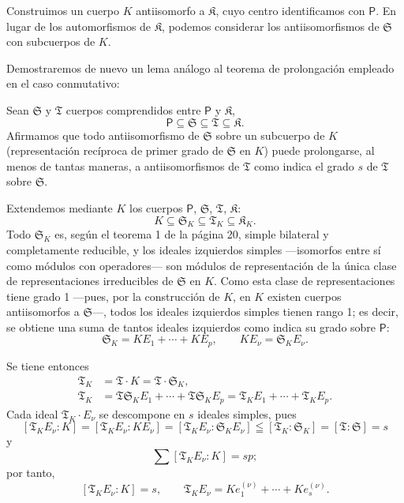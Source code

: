 Construimos un cuerpo \(K\) antiisomorfo a \(\mathfrak K\), cuyo centro identificamos con \(\mathsf P\). En lugar de los automorfismos de \(\mathfrak K\), podemos considerar los antiisomorfismos de \(\mathfrak S\) con subcuerpos de \(K\).

Demostraremos de nuevo un lema análogo al teorema de prolongación empleado en el caso conmutativo:

Sean \(\mathfrak S\) y \(\mathfrak T\) cuerpos comprendidos entre \(\mathsf P\) y \(\mathfrak K\),
\[
\mathsf P \subseteq \mathfrak S \subseteq \mathfrak T \subseteq \mathfrak K.
\]
Afirmamos que todo antiisomorfismo de \(\mathfrak S\) sobre un subcuerpo de \(K\) (representación recíproca de primer grado de \(\mathfrak S\) en \(K\)) puede prolongarse, al menos de tantas maneras, a antiisomorfismos de \(\mathfrak T\) como indica el grado \(s\) de \(\mathfrak T\) sobre \(\mathfrak S\).

Extendemos mediante \(K\) los cuerpos \(\mathsf P\), \(\mathfrak S\), \(\mathfrak T\), \(\mathfrak K\):
\[
K\subseteq \mathfrak S_K\subseteq \mathfrak T_K\subseteq \mathfrak K_K.
\]
Todo \(\mathfrak S_K\) es, según el teorema 1 de la página 20, simple bilateral y completamente reducible, y los ideales izquierdos simples ---isomorfos entre sí como módulos con operadores--- son módulos de representación de la única clase de representaciones irreducibles de \(\mathfrak S\) en \(K\). Como esta clase de representaciones tiene grado 1 ---pues, por la construcción de \(K\), en \(K\) existen cuerpos antiisomorfos a \(\mathfrak S\)---, todos los ideales izquierdos simples tienen rango 1; es decir, se obtiene una suma de tantos ideales izquierdos como indica su grado sobre \(\mathsf P\):
\[
\mathfrak S_K=K E_1+\cdots+K E_p,\qquad K E_\nu=\mathfrak S_K E_\nu.
\]

Se tiene entonces
\[
\begin{aligned}
\mathfrak T_K&=\mathfrak T\cdot K=\mathfrak T\cdot \mathfrak S_K,\\
\mathfrak T_K&=\mathfrak T\mathfrak S_K E_1+\cdots+\mathfrak T\mathfrak S_K E_p
              =\mathfrak T_K E_1+\cdots+\mathfrak T_K E_p.
\end{aligned}
\]
Cada ideal \(\mathfrak T_K\cdot E_\nu\) se descompone en \(s\) ideales simples, pues
\[
[\mathfrak T_K E_\nu:K]=[\mathfrak T_K E_\nu:K E_\nu]=[\mathfrak T_K E_\nu:\mathfrak S_K E_\nu]\leqq[\mathfrak T_K:\mathfrak S_K]=[\mathfrak T:\mathfrak S]=s
\]
y
\[
\sum [\mathfrak T_K E_\nu:K]=sp;
\]
por tanto,
\[
[\mathfrak T_K E_\nu:K]=s,
\qquad
\mathfrak T_K E_\nu=K e_1^{(\nu)}+\cdots+K e_s^{(\nu)}.
\]

